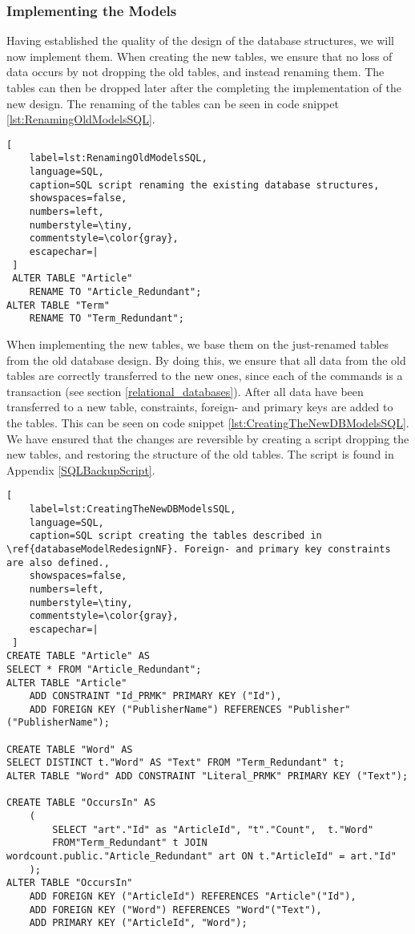 \subsubsection*{Implementing the Models}\label{implementing_new_WC_DB_models}
Having established the quality of the design of the database structures, we will now implement them.
When creating the new tables, we ensure that no loss of data occurs by not dropping the old tables, and instead renaming them. 
The tables can then be dropped later after the completing the implementation of the new design.
The renaming of the tables can be seen in code snippet \ref{lst:RenamingOldModelsSQL}.

\begin{lstlisting}[
    label=lst:RenamingOldModelsSQL,
    language=SQL,
    caption=SQL script renaming the existing database structures,
    showspaces=false,
    numbers=left,
    numberstyle=\tiny,
    commentstyle=\color{gray},
    escapechar=|
 ]
 ALTER TABLE "Article"
    RENAME TO "Article_Redundant";
ALTER TABLE "Term"
    RENAME TO "Term_Redundant";
\end{lstlisting}

When implementing the new tables, we base them on the just-renamed tables from the old database design.
By doing this, we ensure that all data from the old tables are correctly transferred to the new ones, since each of the commands is a transaction (see section \ref{relational_databases}).
After all data have been transferred to a new table, constraints, foreign- and primary keys are added to the tables. 
This can be seen on code snippet \ref{lst:CreatingTheNewDBModelsSQL}.
We have ensured that the changes are reversible by creating a script dropping the new tables, and restoring the structure of the old tables.
The script is found in Appendix \ref{SQLBackupScript}.

\begin{lstlisting}[
    label=lst:CreatingTheNewDBModelsSQL,
    language=SQL,
    caption=SQL script creating the tables described in \ref{databaseModelRedesignNF}. Foreign- and primary key constraints are also defined.,
    showspaces=false,
    numbers=left,
    numberstyle=\tiny,
    commentstyle=\color{gray},
    escapechar=|
 ]
CREATE TABLE "Article" AS
SELECT * FROM "Article_Redundant";
ALTER TABLE "Article"
    ADD CONSTRAINT "Id_PRMK" PRIMARY KEY ("Id"),
    ADD FOREIGN KEY ("PublisherName") REFERENCES "Publisher"("PublisherName");

CREATE TABLE "Word" AS
SELECT DISTINCT t."Word" AS "Text" FROM "Term_Redundant" t;
ALTER TABLE "Word" ADD CONSTRAINT "Literal_PRMK" PRIMARY KEY ("Text");

CREATE TABLE "OccursIn" AS
    (
        SELECT "art"."Id" as "ArticleId", "t"."Count",  t."Word"
        FROM"Term_Redundant" t JOIN wordcount.public."Article_Redundant" art ON t."ArticleId" = art."Id"
    );
ALTER TABLE "OccursIn"
    ADD FOREIGN KEY ("ArticleId") REFERENCES "Article"("Id"),
    ADD FOREIGN KEY ("Word") REFERENCES "Word"("Text"),
    ADD PRIMARY KEY ("ArticleId", "Word");
\end{lstlisting}

